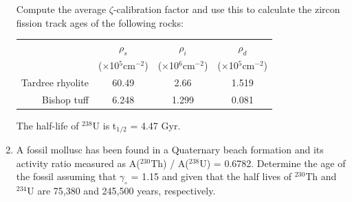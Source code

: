 \begin{enumerate}
Compute the average $\zeta$-calibration factor and use this to
calculate the zircon fission track ages of the following rocks:

\begin{centering}
\begin{tabular}{r@{~}c@{~}c@{~}c}
~ & $\rho_s$ & $\rho_i$ & $\rho_d$ \\
~ & ($\times$10$^5$cm$^{-2}$) & ($\times$10$^6$cm$^{-2}$) & ($\times$10$^5$cm$^{-2}$)\\
\hline
Tardree rhyolite & 60.49 & 2.66 & 1.519 \\
Bishop tuff & 6.248 & 1.299 & 0.081 \\
\end{tabular}
\end{centering}

The half-life of $^{238}$U is t$_{1/2}$ = 4.47 Gyr.\\

\item A fossil mollusc has been found in a Quaternary beach formation
  and its activity ratio measured as A($^{230}$Th) / A($^{238}$U) =
  0.6782. Determine the age of the fossil assuming that $\gamma_\circ$
  = 1.15 and given that the half lives of $^{230}$Th and $^{234}$U are
  75,380 and 245,500 years,
  respectively. 

\end{enumerate}
